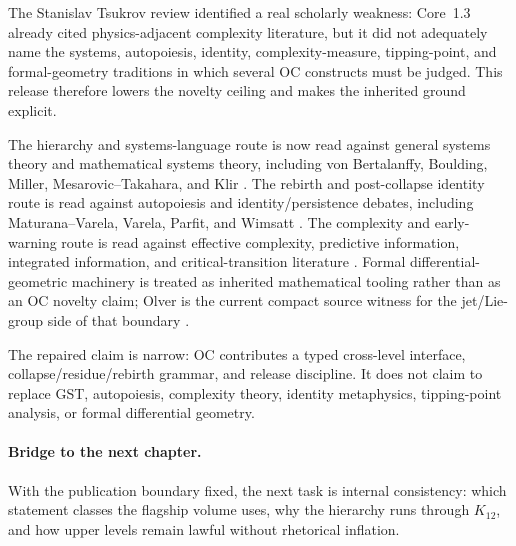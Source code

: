 The Stanislav Tsukrov review identified a real scholarly weakness: Core~1.3
already cited physics-adjacent complexity literature, but it did not adequately
name the systems, autopoiesis, identity, complexity-measure, tipping-point, and
formal-geometry traditions in which several OC constructs must be judged. This
release therefore lowers the novelty ceiling and makes the inherited ground
explicit.

The hierarchy and systems-language route is now read against general systems
theory and mathematical systems theory, including von Bertalanffy,
Boulding, Miller, Mesarovic--Takahara, and Klir
\cite{bertalanffy_general_system_theory,boulding_general_systems_theory,miller_living_systems,mesarovic_takahara_general_systems,klir_architecture_systems}.
The rebirth and post-collapse identity route is read against autopoiesis and
identity/persistence debates, including Maturana--Varela, Varela, Parfit, and
Wimsatt \cite{maturana_varela_autopoiesis,varela_biological_autonomy,parfit_reasons_persons,wimsatt_reductionism_levels}.
The complexity and early-warning route is read against effective complexity,
predictive information, integrated information, and critical-transition
literature \cite{gell_mann_effective_complexity,bialek_predictability_complexity,tononi_information_integration,scheffer_critical_transitions,dakos_early_warning}.
Formal differential-geometric machinery is treated as inherited mathematical
tooling rather than as an OC novelty claim; Olver is the current compact source
witness for the jet/Lie-group side of that boundary \cite{olver_lie_groups}.

The repaired claim is narrow: OC contributes a typed cross-level interface,
collapse/residue/rebirth grammar, and release discipline. It does not claim to
replace GST, autopoiesis, complexity theory, identity metaphysics, tipping-point
analysis, or formal differential geometry.

\paragraph{Bridge to the next chapter.}
With the publication boundary fixed, the next task is internal consistency:
which statement classes the flagship volume uses, why the hierarchy runs
through \(K_{12}\), and how upper levels remain lawful without rhetorical
inflation.

\clearpage

